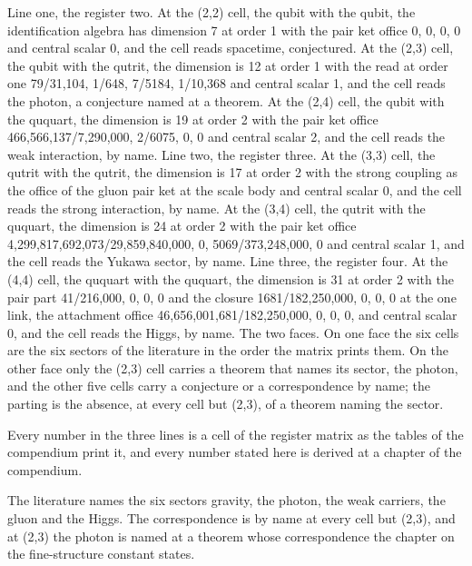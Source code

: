 \begin{chwall}
Line one, the register two. At the (2,2) cell, the qubit with the qubit, the identification algebra has dimension 7 at order 1 with the pair ket office 0, 0, 0, 0 and central scalar 0, and the cell reads spacetime, conjectured. At the (2,3) cell, the qubit with the qutrit, the dimension is 12 at order 1 with the read at order one 79/31,104, 1/648, 7/5184, 1/10,368 and central scalar 1, and the cell reads the photon, a conjecture named at a theorem. At the (2,4) cell, the qubit with the ququart, the dimension is 19 at order 2 with the pair ket office 466,566,137/7,290,000, 2/6075, 0, 0 and central scalar 2, and the cell reads the weak interaction, by name.
Line two, the register three. At the (3,3) cell, the qutrit with the qutrit, the dimension is 17 at order 2 with the strong coupling as the office of the gluon pair ket at the scale body and central scalar 0, and the cell reads the strong interaction, by name. At the (3,4) cell, the qutrit with the ququart, the dimension is 24 at order 2 with the pair ket office 4,299,817,692,073/29,859,840,000, 0, 5069/373,248,000, 0 and central scalar 1, and the cell reads the Yukawa sector, by name.
Line three, the register four. At the (4,4) cell, the ququart with the ququart, the dimension is 31 at order 2 with the pair part 41/216,000, 0, 0, 0 and the closure 1681/182,250,000, 0, 0, 0 at the one link, the attachment office 46,656,001,681/182,250,000, 0, 0, 0, and central scalar 0, and the cell reads the Higgs, by name.
The two faces. On one face the six cells are the six sectors of the literature in the order the matrix prints them. On the other face only the (2,3) cell carries a theorem that names its sector, the photon, and the other five cells carry a conjecture or a correspondence by name; the parting is the absence, at every cell but (2,3), of a theorem naming the sector.
\end{chwall}
\chdeps{}{}
Every number in the three lines is a cell of the register matrix as the tables of the compendium print it, and every number stated here is derived at a chapter of the compendium.
\begin{chbridge}
The literature names the six sectors gravity, the photon, the weak carriers, the gluon and the Higgs. The correspondence is by name at every cell but (2,3), and at (2,3) the photon is named at a theorem whose correspondence the chapter on the fine-structure constant states.
\end{chbridge}
